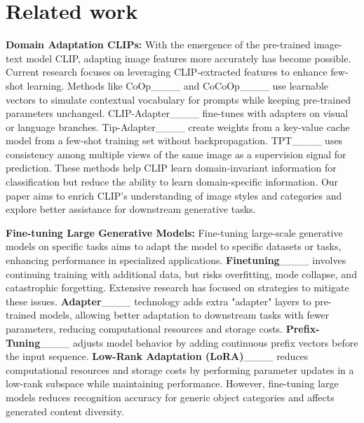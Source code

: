 \section{Related work}
\textbf{Domain Adaptation CLIPs:} With the emergence of the pre-trained image-text model CLIP, adapting image features more accurately has become possible. Current research focuses on leveraging CLIP-extracted features to enhance few-shot learning. Methods like CoOp____ and CoCoOp____ use learnable vectors to simulate contextual vocabulary for prompts while keeping pre-trained parameters unchanged. CLIP-Adapter____ fine-tunes with adapters on visual or language branches. Tip-Adapter____ create weights from a key-value cache model from a few-shot training set without backpropagation. TPT____ uses consistency among multiple views of the same image as a supervision signal for prediction. These methods help CLIP learn domain-invariant information for classification but reduce the ability to learn domain-specific information. Our paper aims to enrich CLIP's understanding of image styles and categories and explore better assistance for downstream generative tasks.

\textbf{Fine-tuning Large Generative Models: }
Fine-tuning large-scale generative models on specific tasks aims to adapt the model to specific datasets or tasks, enhancing performance in specialized applications. \textbf{Finetuning}____ involves continuing training with additional data, but risks overfitting, mode collapse, and catastrophic forgetting. Extensive research has focused on strategies to mitigate these issues. \textbf{Adapter}____ technology adds extra "adapter" layers to pre-trained models, allowing better adaptation to downstream tasks with fewer parameters, reducing computational resources and storage costs. \textbf{Prefix-Tuning}____ adjusts model behavior by adding continuous prefix vectors before the input sequence. \textbf{Low-Rank Adaptation (LoRA)}____ reduces computational resources and storage costs by performing parameter updates in a low-rank subspace while maintaining performance. However, fine-tuning large models reduces recognition accuracy for generic object categories and affects generated content diversity.